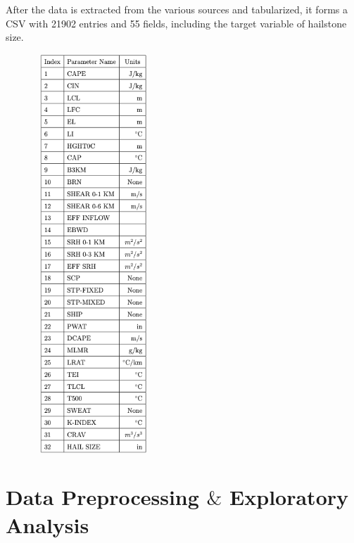 \documentclass[fleqn,10pt]{SelfArx} %
\begin{document}
After the data is extracted from the various sources and tabularized, it forms a CSV with 21902 entries and 55 fields, including the target variable of hailstone size.
\begin{figure}[H]
\centering
\includegraphics[width = 4.5cm, height = 15cm]{"table2.png"}
\end{figure}

\bigskip
\bigskip


\section{Data Preprocessing $\&$ Exploratory Analysis} %
\end{document}
